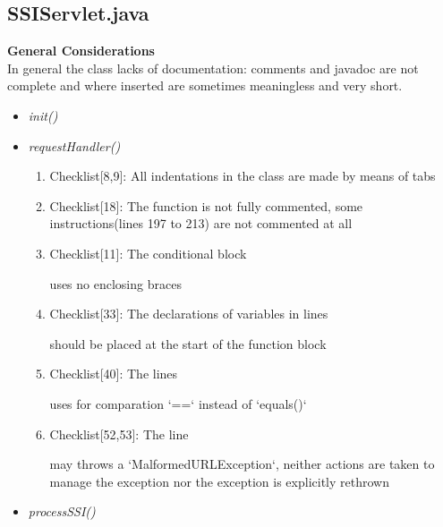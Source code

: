 \documentclass[11pt,titlepage]{article} %
\begin{document}
\subsection{SSIServlet.java}
  \textbf{General Considerations} \hfill \\
  In general the class lacks of documentation: comments and javadoc are not complete and where inserted are sometimes meaningless and very short.
  \begin{itemize}
   \item \textit{init()}
   \item \textit{requestHandler()}
    \begin{enumerate}
     \item Checklist[8,9]: All indentations in the class are made by means of tabs
     \item Checklist[18]: The function is not fully commented, some instructions(lines 197 to 213) are not commented at all
     \item Checklist[11]: The conditional block
      
      uses no enclosing braces
     \item Checklist[33]: The declarations of variables in lines
      
      
      should be placed at the start of the function block
     \item Checklist[40]: The lines
      
      
      
      
      uses for comparation `==` instead of `equals()`
     \item Checklist[52,53]: The line 
      
      may throws a `MalformedURLException`, neither actions are taken to manage the exception nor the exception is explicitly rethrown
    \end{enumerate}
   \item \textit{processSSI()}
  \end{itemize}
\end{document}

